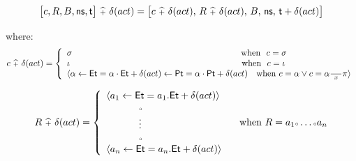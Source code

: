 \begin{displaymath}
  \big[ c,R,B,\text{\sffamily ns},\text{\sffamily t} \big] 
\ {\scriptstyle {\widehat{+}}}\  \delta (act) = 
\big[ c \ {\scriptstyle {\widehat{+}}}\  \delta (act), \, R \ {\scriptstyle {\widehat{+}}}\  \delta (act), \,
B, \, \text{\sffamily ns}, \, \text{\sffamily t}+\delta (act)\big]
\end{displaymath}

\noindent
where:
\begin{equation} 
\nonumber
  c\sqplus\delta (act) = \left \{
    \begin{array}{l}
      \sigma\qquad\qquad\qquad\qquad\qquad\qquad\qquad\quad\quad\quad\quad\quad\ \ \text{when}
      \ \ c=\sigma \\
      \iota
      \qquad\qquad\qquad\qquad\qquad\qquad\qquad\quad\quad\quad\quad\quad\ \ \ \text{when}\ \ c=\iota
      \\
      \langle\alpha\gets\SFT{Et}=\alpha\cdot\SFT{Et}+\delta (act)
      \gets\SFT{Pt}=\alpha\cdot\SFT{Pt}+\delta (act)\ \ \ \text{when}
      \  c=\alpha\vee c=\alpha\rx\pi\rangle     
    \end{array} 
    \right.
\end{equation}

\begin{equation}
\nonumber
  R\ {\scriptstyle {\widehat{+}}}\ \delta (act) = \left \{
    \begin{array}{l}
      \langle a_1\gets\text{\sffamily Et}=a_1.\text{\sffamily Et}+\delta (act) \rangle \\
      \ \ \ \ \ \ \ \ \ \ {\scriptscriptstyle \circ} \\
      \ \ \ \ \ \ \ \ \ \ \vdots \\
      \ \ \ \ \ \ \ \ \ \ {\scriptscriptstyle \circ} \\
      \langle a_n\gets\text{\sffamily Et}=a_n.\text{\sffamily Et}+\delta (act) \rangle\
    \end{array}
    \quad\text{when}\ R=a_1{\scriptscriptstyle \circ}\ldots{\scriptscriptstyle \circ} a_n
    \right.
\end{equation}



